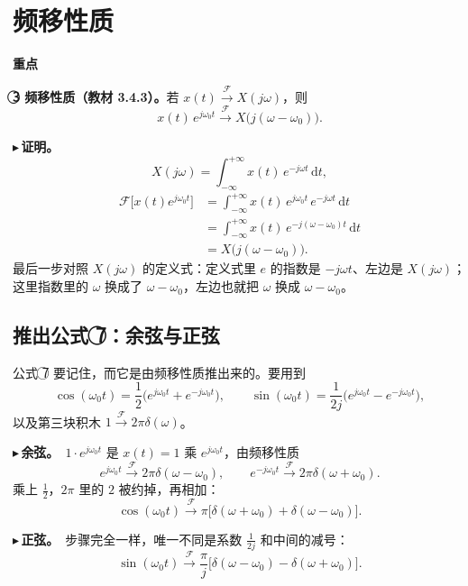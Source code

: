 \documentclass[UTF8,a4paper,11pt]{ctexart}
\newcommand{\dd}{\mathrm{d}}
\newcommand{\F}{\mathcal{F}}
\newcommand{\cn}[1]{\textcircled{\scriptsize #1}}
\newenvironment{remember}{\begin{rememberbox}\textbf{重点}\par\smallskip}{\end{rememberbox}}
\newcounter{ex}[section]
\newcommand{\point}[1]{\par\addvspace{1ex}\noindent\textcolor{ptteal}{$\blacktriangleright$\,\textbf{#1}}\ }
\begin{document}
\section{频移性质}\label{sec:fshift}
\begin{remember}
\textbf{\cn3 频移性质（教材 3.4.3）。}若 $x(t)\xrightarrow{\F}X(j\omega)$，则
\[
x(t)\,e^{j\omega_0t}\xrightarrow{\F}X\big(j(\omega-\omega_0)\big).
\]
\end{remember}

\point{证明。}
\[
X(j\omega)=\int_{-\infty}^{+\infty}x(t)\,e^{-j\omega t}\,\dd t ,
\]
\[
\begin{aligned}
\F\big[x(t)e^{j\omega_0t}\big]&=\int_{-\infty}^{+\infty}x(t)\,e^{j\omega_0t}\,e^{-j\omega t}\,\dd t\\
&=\int_{-\infty}^{+\infty}x(t)\,e^{-j(\omega-\omega_0)t}\,\dd t\\
&=X\big(j(\omega-\omega_0)\big).
\end{aligned}
\]
最后一步对照 $X(j\omega)$ 的定义式：定义式里 $e$ 的指数是 $-j\omega t$、左边是 $X(j\omega)$；这里指数里的 $\omega$ 换成了 $\omega-\omega_0$，左边也就把 $\omega$ 换成 $\omega-\omega_0$。

\subsection{推出公式 \texorpdfstring{\cn7}{⑦}：余弦与正弦}\label{sub:cossin}
公式 \cn7 要记住，而它是由频移性质推出来的。要用到
\[
\cos(\omega_0t)=\frac12\big(e^{j\omega_0t}+e^{-j\omega_0t}\big),\qquad
\sin(\omega_0t)=\frac1{2j}\big(e^{j\omega_0t}-e^{-j\omega_0t}\big),
\]
以及第三块积木 $1\xrightarrow{\F}2\pi\delta(\omega)$。

\point{余弦。}$1\cdot e^{j\omega_0t}$ 是 $x(t)=1$ 乘 $e^{j\omega_0t}$，由频移性质
\[
e^{j\omega_0t}\xrightarrow{\F}2\pi\delta(\omega-\omega_0),\qquad e^{-j\omega_0t}\xrightarrow{\F}2\pi\delta(\omega+\omega_0).
\]
乘上 $\frac12$，$2\pi$ 里的 $2$ 被约掉，再相加：
\[
\cos(\omega_0t)\xrightarrow{\F}\pi\big[\delta(\omega+\omega_0)+\delta(\omega-\omega_0)\big].
\]
\point{正弦。}步骤完全一样，唯一不同是系数 $\frac1{2j}$ 和中间的减号：
\[
\sin(\omega_0t)\xrightarrow{\F}\frac\pi j\big[\delta(\omega-\omega_0)-\delta(\omega+\omega_0)\big].
\]
\end{document}
